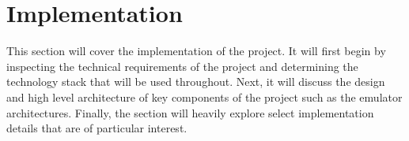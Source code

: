 \section{Implementation}
\label{section:implementation}

This section will cover the implementation of the project. It will first begin by inspecting the technical requirements of the project and determining the technology stack that will be used throughout. Next, it will discuss the design and high level architecture of key components of the project such as the emulator architectures. Finally, the section will heavily explore select implementation details that are of particular interest.









